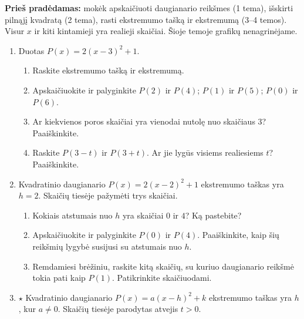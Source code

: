 \documentclass[12pt,a4paper]{article}
\begin{document}
\textbf{Prieš pradėdamas:} mokėk apskaičiuoti daugianario reikšmes (1 tema), išskirti pilnąjį kvadratą (2 tema), rasti ekstremumo tašką ir ekstremumą (3–4 temos). Visur $x$ ir kiti kintamieji yra realieji skaičiai. Šioje temoje grafikų nenagrinėjame.
\begin{enumerate}
\item Duotas $P(x)=2(x-3)^2+1$.
\begin{enumerate}
\item Raskite ekstremumo tašką ir ekstremumą.
\item Apskaičiuokite ir palyginkite $P(2)$ ir $P(4)$; $P(1)$ ir $P(5)$; $P(0)$ ir $P(6)$.
\item Ar kiekvienos poros skaičiai yra vienodai nutolę nuo skaičiaus $3$? Paaiškinkite.
\item Raskite $P(3-t)$ ir $P(3+t)$. Ar jie lygūs visiems realiesiems $t$? Paaiškinkite.
\end{enumerate}
\item Kvadratinio daugianario $P(x)=2(x-2)^2+1$ ekstremumo taškas yra $h=2$. Skaičių tiesėje pažymėti trys skaičiai.
\begin{center}\end{center}
\begin{enumerate}
\item Kokiais atstumais nuo $h$ yra skaičiai $0$ ir $4$? Ką pastebite?
\item Apskaičiuokite ir palyginkite $P(0)$ ir $P(4)$. Paaiškinkite, kaip šių reikšmių lygybė susijusi su atstumais nuo $h$.
\item Remdamiesi brėžiniu, raskite kitą skaičių, su kuriuo daugianario reikšmė tokia pati kaip $P(1)$. Patikrinkite skaičiuodami.
\end{enumerate}
\item $\star$ Kvadratinio daugianario $P(x)=a(x-h)^2+k$ ekstremumo taškas yra $h$, kur $a\ne0$. Skaičių tiesėje parodytas atvejis $t>0$.
\begin{center}
\end{center}
\end{enumerate}
\end{document}

